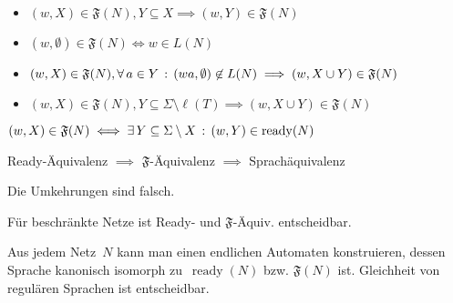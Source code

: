 \documentclass{cheat-sheet}
\DeclareMathOperator{\ready}{ready} %
\newcommand{\Failure}{\mathfrak{F}} %
\begin{document}
\begin{lem}
  \begin{itemize}
    \item $(w, X) \in \Failure(N), Y \subseteq X \implies (w, Y) \in \Failure(N)$
    \item $(w, \emptyset) \in \Failure(N) \iff w \in L(N)$
    \item $(w, X) \in \Failure(N), \fa{a \in Y} (wa, \emptyset) \not\in L(N) \implies (w, X \cup Y) \in \Failure(N)$
    \item $(w, X) \in \Failure(N), Y \subseteq \Sigma \setminus \ell(T) \implies (w, X \cup Y) \in \Failure(N)$
  \end{itemize}
\end{lem}

\begin{lem}
  $
    (w, X) \in \Failure(N) \iff \ex{Y \subseteq \Sigma \setminus X} (w, Y) \in \ready(N)
  $
\end{lem}

\begin{satz}
  Ready-Äquivalenz $\implies$ $\Failure$-Äquivalenz $\implies$ Sprachäquivalenz
\end{satz}

\begin{bem}
  Die Umkehrungen sind falsch.
\end{bem}

\begin{satz}
  Für beschränkte Netze ist Ready- und $\Failure$-Äquiv. entscheidbar.
\end{satz}

\begin{beweisidee}
  Aus jedem Netz~$N$ kann man einen endlichen Automaten konstruieren, dessen Sprache kanonisch isomorph zu~$\ready(N)$ bzw. $\Failure(N)$ ist.
  Gleichheit von regulären Sprachen ist entscheidbar.
\end{beweisidee}

\end{document}
